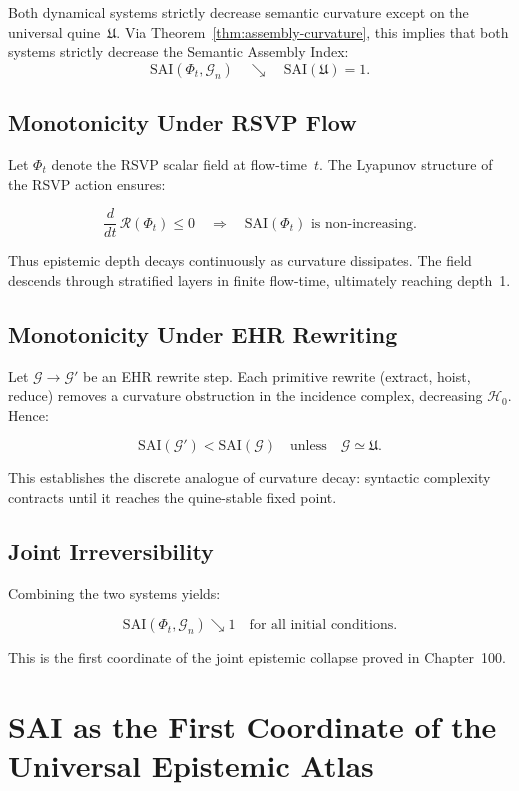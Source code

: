Both dynamical systems strictly decrease semantic curvature except on the
universal quine~$\mathfrak{U}$.
Via Theorem~\ref{thm:assembly-curvature}, this implies that both systems
strictly decrease the Semantic Assembly Index:
\[
\mathrm{SAI}(\Phi_t,\mathcal{G}_n)
  \quad\searrow\quad \mathrm{SAI}(\mathfrak{U})=1.
\]

\subsection{Monotonicity Under RSVP Flow}

Let $\Phi_t$ denote the RSVP scalar field at flow-time~$t$.
The Lyapunov structure of the RSVP action ensures:

\[
\frac{d}{dt}\,\mathcal{R}(\Phi_t) \le 0
\quad\Longrightarrow\quad
\mathrm{SAI}(\Phi_t) \text{ is non-increasing}.
\]

Thus epistemic depth decays continuously as curvature dissipates.
The field descends through stratified layers in finite flow-time, ultimately
reaching depth~1.

\subsection{Monotonicity Under EHR Rewriting}

Let $\mathcal{G}\!\to\!\mathcal{G}'$ be an EHR rewrite step.
Each primitive rewrite (extract, hoist, reduce) removes a curvature
obstruction in the incidence complex, decreasing $\mathcal{H}_0$.
Hence:

\[
\mathrm{SAI}(\mathcal{G}') < \mathrm{SAI}(\mathcal{G})
\quad\text{unless}\quad
\mathcal{G}\simeq\mathfrak{U}.
\]

This establishes the discrete analogue of curvature decay:
syntactic complexity contracts until it reaches the quine-stable fixed point.

\subsection{Joint Irreversibility}

Combining the two systems yields:

\[
\mathrm{SAI}(\Phi_t,\mathcal{G}_n) \searrow 1
\quad\text{for all initial conditions}.
\]

This is the first coordinate of the joint epistemic collapse proved in
Chapter~100.



\section{SAI as the First Coordinate of the Universal Epistemic Atlas}

